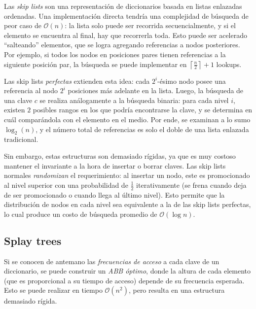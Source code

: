 \documentclass{article}
\newcommand{\BigO}[1]{{\mathcal{O}(#1)}}
\begin{document}
Las \textit{skip lists} son una representación de diccionarios basada en listas enlazadas ordenadas. Una implementación directa tendría una complejidad de búsqueda de peor caso de $\BigO{n}$: la lista solo puede ser recorrida secuencialmente, y si el elemento se encuentra al final, hay que recorrerla toda. Esto puede ser acelerado ``salteando'' elementos, que se logra agregando referencias a nodos posteriores. Por ejemplo, si todos los nodos en posiciones pares tienen referencias a la siguiente posición par, la búsqueda se puede implementar en $\left\lceil \frac{n}{2} \right\rceil + 1$ lookups.

Las skip lists \textit{perfectas} extienden esta idea: cada $2^i$-ésimo nodo posee una referencia al nodo $2^i$ posiciones más adelante en la lista. Luego, la búsqueda de una clave $c$ se realiza análogamente a la búsqueda binaria: para cada nivel $i$, existen $2$ posibles rangos en los que podría encontrarse la clave, y se determina en cuál comparándola con el elemento en el medio. Por ende, se examinan a lo sumo $\log_2(n)$, y el número total de referencias es solo el doble de una lista enlazada tradicional.

Sin embargo, estas estructuras son demasiado rígidas, ya que es muy costoso mantener el invariante a la hora de insertar o borrar claves. Las skip lists normales \textit{randomizan} el requerimiento: al insertar un nodo, este es promocionado al nivel superior con una probabilidad de $\frac{1}{2}$ iterativamente (se frena cuando deja de ser promocionado o cuando llega al último nivel). Esto permite que la distribución de nodos en cada nivel sea equivalente a la de las skip lists perfectas, lo cual produce un costo de búsqueda promedio de $\BigO{\log{n}}$.

\subsection{Splay trees}

Si se conocen de antemano las \textit{frecuencias de acceso} a cada clave de un diccionario, se puede construir un \textit{ABB óptimo}, donde la altura de cada elemento (que es proporcional a su tiempo de acceso) depende de su frecuencia esperada. Esto se puede realizar en tiempo $\BigO{n^2}$, pero resulta en una estructura demasiado rígida.
\end{document}
